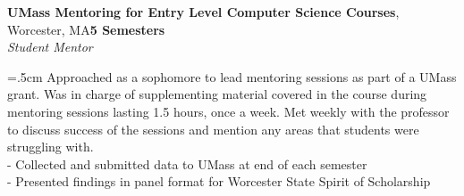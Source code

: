 \documentclass[10pt,notitlepage]{article}
\newcommand{\B}[1]{\textbf{#1}}
\newcommand{\I}[1]{\textit{#1}}
\begin{document}
\noindent \B{UMass Mentoring for Entry Level Computer Science Courses}, Worcester,
MA\hfill\B{5 Semesters}\\
\I{Student Mentor}

\hangindent=.5cm Approached as a sophomore to lead mentoring
sessions as part of a UMass grant. Was in charge of supplementing material covered in the course
during mentoring sessions lasting 1.5 hours, once a week. Met weekly with the professor to 
discuss success of the sessions and mention any areas that students were struggling with.
\\
\indent - Collected and submitted data to UMass at end of each semester\\
\indent - Presented findings in panel format for Worcester State Spirit of Scholarship
\end{document}
